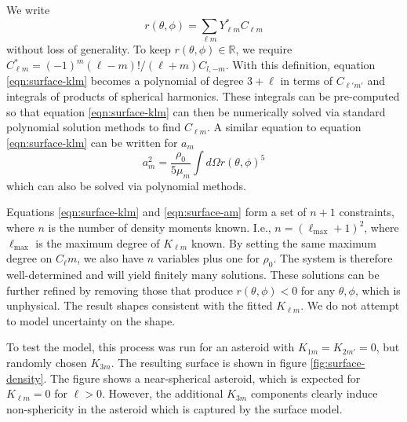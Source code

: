 \documentclass[fleqn,usenatbib]{mnras}
\begin{document}
We write 
\begin{equation}
  r(\theta, \phi) = \sum_{\ell m} Y_{\ell m}^* C_{\ell m}
\end{equation}
without loss of generality. To keep $r(\theta, \phi) \in \mathds{R}$, we require $C_{\ell m}^* = (-1)^m (\ell-m)!/(\ell+m) C_{l,-m}$. With this definition, equation \ref{eqn:surface-klm} becomes a polynomial of degree $3+\ell$ in terms of $C_{\ell' m'}$ and integrals of products of spherical harmonics. These integrals can be pre-computed so that equation \ref{eqn:surface-klm} can then be numerically solved via standard polynomial solution methods to find $C_{\ell m}$. A similar equation to equation \ref{eqn:surface-klm} can be written for $a_m$
\begin{equation}
  a_m^2 = \frac{\rho_0}{5\mu_m}\int d\Omega r(\theta, \phi)^5
  \label{eqn:surface-am}
\end{equation}
which can also be solved via polynomial methods.

Equations \ref{eqn:surface-klm} and \ref{eqn:surface-am} form a set of $n+1$ constraints, where $n$ is the number of density moments known. I.e., $n=(\ell_\text{max}+1)^2$, where $\ell_\text{max}$ is the maximum degree of $K_{\ell m}$ known. By setting the same maximum degree on $C_\ell m$, we also have $n$ variables plus one for $\rho_0$. The system is therefore well-determined and will yield finitely many solutions. These solutions can be further refined by removing those that produce $r(\theta, \phi) < 0$ for any $\theta, \phi$, which is unphysical. The result shapes consistent with the fitted $K_{\ell m}$. We do not attempt to model uncertainty on the shape.

To test the model, this process was run for an asteroid with $K_{1m}=K_{2m'}=0$, but randomly chosen $K_{3m}$. The resulting surface is shown in figure \ref{fig:surface-density}. The figure shows a near-spherical asteroid, which is expected for $K_{\ell m} = 0$ for $\ell > 0$. However, the additional $K_{3m}$ components clearly induce non-sphericity in the asteroid which is captured by the surface model.
\end{document}
